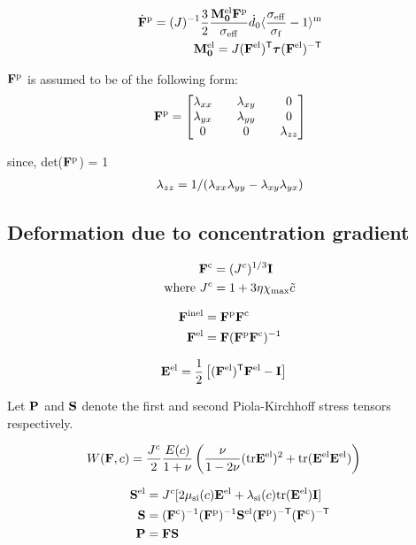 \documentclass[../main.tex]{subfiles}
\begin{document}
\begin{align}
\dot{\F}^\p = \inv{J} \fc{3}{2} \fc{\Mel \F^\p}{\sigmaeff} \dZEROdot \langle \fc{\sigmaeff}{\sigmaf} - 1 \rangle^\m  \\
\Mel = J (\F^\el)^\T \DCS (\F^\el)^\mT
\end{align}

$\F^{\rm{p}}$ is assumed to be of the following form:
\begin{align}
    \F^\p = \tensorxy{\lambda}
\end{align}

since, det($\F^\p$) = 1
\begin{gather}
     \lamzz = 1/(\lamxx \lamyy - \lamxy \lamyx)
\end{gather}



\subsection{Deformation due to concentration gradient}
\begin{align}
    \F^\c &= (\jc)^{1/3} \I \\
    \text{where } \jc &= 1 + 3 \eta \xmax \tc
\end{align}



\begin{align}
    \F^\inel &= \F^\p \F^\c\\
    \F^\el &=  \F \inv{\F^\p \F^\c}
\end{align}






\begin{align}
\E^{\el} &= \fc{1}{2} \left[ (\F^\el)^\T \F^\el - \I \right]
\end{align}





Let $\PK$ and $\PKS$ denote the first and second Piola-Kirchhoff stress tensors respectively.

\begin{align}
    W(\F, c) &= \fc{\jc}{2}\fc{E(c)}{1 + \nu}\left( \fc{\nu}{1-2\nu}(\text{tr}\E^\el)^2 + \tr{\E^\el \E^\el}\right)
\end{align}

\begin{align}
    \PKS^\el &= \jc[2 \muSic \E^\el + \lamSic \tr{\E^\el}\I ]\\
    \PKS &= \inv{\F^\c} \inv{\F^\p} \PKS^\el \invT{\F^\p} \invT{\F^\c} \\
    \PK &= \F \PKS 
\end{align}
\end{document}
